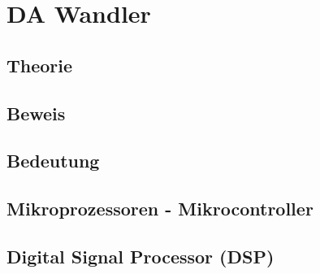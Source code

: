 \documentclass[a4paper,12pt]{article}
\theoremstyle{plain}
\begin{document}
\section{DA Wandler}\label{4}
\newpage
\subsection{Theorie}\label{4.1}
\subsection{Beweis}\label{4.2}
\subsection{Bedeutung}\label{4.3}
\subsection{Mikroprozessoren - Mikrocontroller}\label{4.4}
\subsection{Digital Signal Processor (DSP)}\label{4.5}
\newpage


\end{document}
